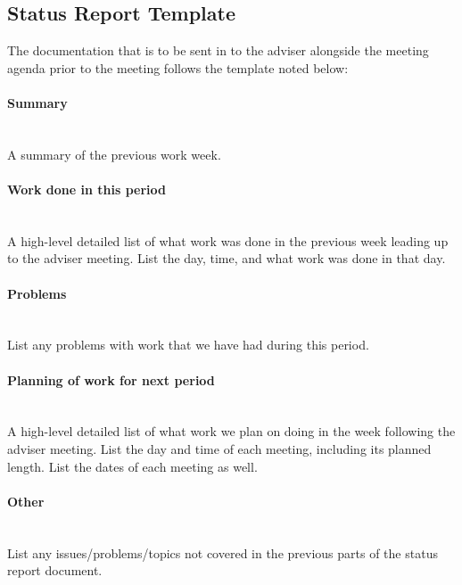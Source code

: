 \documentclass[../document]{subfiles}
\begin{document}
\subsection{Status Report Template}
\label{status_report_template}
The documentation that is to be sent in to the adviser alongside the meeting agenda prior to the meeting follows the template noted below:

\paragraph{Summary} \ \\
A summary of the previous work week.

\paragraph{Work done in this period} \ \\
A high-level detailed list of what work was done in the previous week leading up to the adviser meeting. List the day, time, and what work was done in that day.

\paragraph{Problems} \ \\
List any problems with work that we have had during this period.

\paragraph{Planning of work for next period} \ \\
A high-level detailed list of what work we plan on doing in the week following the adviser meeting. List the day and time of each meeting, including its planned length. List the dates of each meeting as well.

\paragraph{Other} \ \\
List any issues/problems/topics not covered in the previous parts of the status report document.
\end{document}
